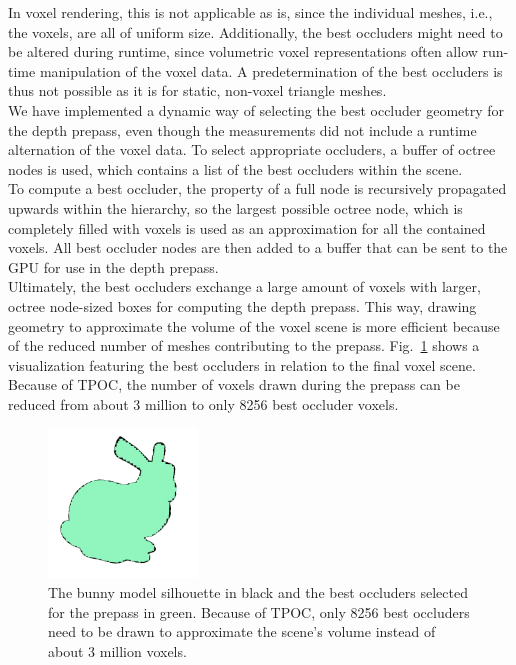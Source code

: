 \documentclass[conference]{IEEEtran}
\begin{document}
\noindent
In voxel rendering, this is not applicable as is, since the individual meshes, i.e., the voxels, are all 
of uniform size. Additionally, the best occluders might need to be altered during runtime, since 
volumetric voxel representations often allow run-time manipulation of the voxel data. A predetermination 
of the best occluders is thus not possible as it is for static, non-voxel triangle meshes. \\

\noindent   %
We have implemented a dynamic way of selecting the best occluder geometry for the depth prepass, even 
though the measurements did not include a runtime alternation of the voxel data. To select appropriate 
occluders, a buffer of octree nodes is used, which contains a list of the best occluders within the scene. \\

\noindent
To compute a best occluder, the property of a full node is recursively propagated upwards within the hierarchy, 
so the largest possible octree node, which is completely filled with voxels is used as an approximation for 
all the contained voxels. All best occluder nodes are then added to a buffer that can be sent to the \ac{GPU} for 
use in the depth prepass. \\

\noindent
Ultimately, the best occluders exchange a large amount of voxels with larger, octree node-sized boxes for 
computing the depth prepass. This way, drawing geometry to approximate the volume of the voxel scene is 
more efficient because of the reduced number of meshes contributing to the prepass. 
Fig.~\ref{fig:best-occluder-selection} shows a visualization featuring the best occluders in relation 
to the final voxel scene. Because of \ac{TPOC}, the number of voxels drawn during the prepass can be reduced 
from about 3 million to only 8256 best occluder voxels.

\begin{figure}
    \centering
    \includegraphics[width=150px]{images/bunny-best-occluder-outline.png}
    \caption{The bunny model silhouette in black and the best occluders selected for the prepass in green.
    Because of \ac{TPOC}, only 8256 best occluders need to be drawn to approximate the scene's volume instead of about 3 million voxels.}
    \label{fig:best-occluder-selection}
\end{figure}
\end{document}
